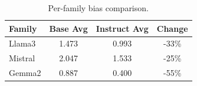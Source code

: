 \begin{table}[h]
\centering\small
\caption{Per-family bias comparison.}
\label{tab:families}
\begin{tabular}{lccc}
\toprule
Family & Base Avg & Instruct Avg & Change \\
\midrule
Llama3 & 1.473 & 0.993 & -33\% \\
Mistral & 2.047 & 1.533 & -25\% \\
Gemma2 & 0.887 & 0.400 & -55\% \\
\bottomrule
\end{tabular}
\end{table}